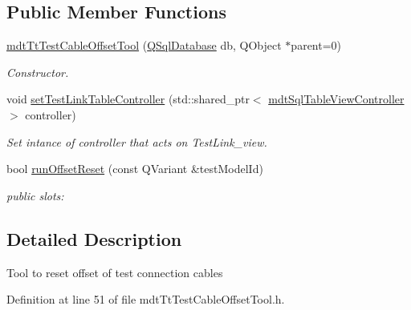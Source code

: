 \subsection*{Public Member Functions}
\begin{DoxyCompactItemize}
\item 
\hyperlink{classmdt_tt_test_cable_offset_tool_ab09f443d0d7720c54625228e7e70088b}{mdt\-Tt\-Test\-Cable\-Offset\-Tool} (\hyperlink{class_q_sql_database}{Q\-Sql\-Database} db, Q\-Object $\ast$parent=0)
\begin{DoxyCompactList}\small\item\em Constructor. \end{DoxyCompactList}\item 
void \hyperlink{classmdt_tt_test_cable_offset_tool_a2ebde2cd3e205b4da7fc1d73766d3e9c}{set\-Test\-Link\-Table\-Controller} (std\-::shared\-\_\-ptr$<$ \hyperlink{classmdt_sql_table_view_controller}{mdt\-Sql\-Table\-View\-Controller} $>$ controller)
\begin{DoxyCompactList}\small\item\em Set intance of controller that acts on Test\-Link\-\_\-view. \end{DoxyCompactList}\item 
bool \hyperlink{classmdt_tt_test_cable_offset_tool_adc55a81199c41f03fb98cfa4899985db}{run\-Offset\-Reset} (const Q\-Variant \&test\-Model\-Id)
\begin{DoxyCompactList}\small\item\em public slots\-: \end{DoxyCompactList}\end{DoxyCompactItemize}


\subsection{Detailed Description}
Tool to reset offset of test connection cables 

Definition at line 51 of file mdt\-Tt\-Test\-Cable\-Offset\-Tool.\-h.



